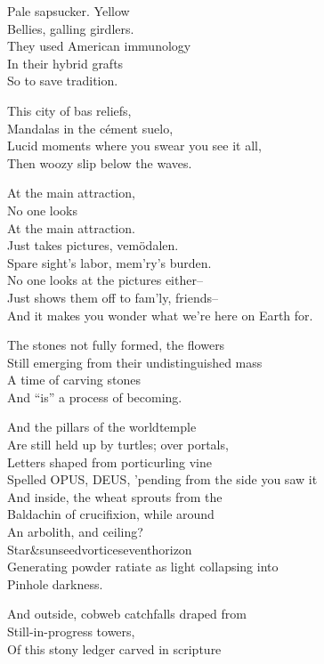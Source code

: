 Pale sapsucker. Yellow \\
Bellies, galling girdlers. \\
They used American immunology \\
In their hybrid grafts \\
So to save tradition.

This city of bas reliefs, \\
Mandalas in the cément suelo, \\
Lucid moments where you swear you see it all, \\
Then woozy slip below the waves.

At the main attraction, \\
No one looks \\
At the main attraction. \\
Just takes pictures, vemödalen. \\
Spare sight's labor, mem'ry's burden. \\

No one looks at the pictures either-- \\
Just shows them off to fam'ly, friends-- \\
And it makes you wonder what we're here on Earth for.

The stones not fully formed, the flowers \\
Still emerging from their undistinguished mass \\
A time of carving stones \\
And ``is'' a process of becoming.

And the pillars of the worldtemple \\
Are still held up by turtles; over portals, \\
Letters shaped from porticurling vine \\
Spelled OPUS, DEUS, 'pending from the side you saw it \\
And inside, the wheat sprouts from the  \\
Baldachin of crucifixion, while around \\
An arbolith, and ceiling?  \\
Star\&sunseedvorticeseventhorizon \\
Generating powder ratiate as light collapsing into \\
Pinhole darkness.

And outside, cobweb catchfalls draped from \\
Still-in-progress towers, \\
Of this stony ledger carved in scripture

